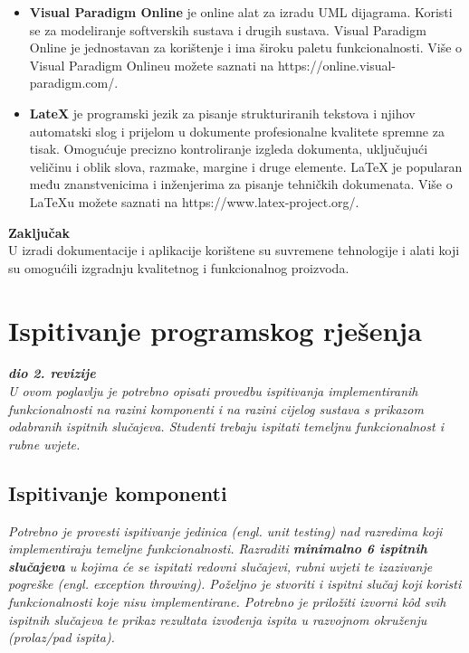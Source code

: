 \begin{itemize}
			\item\textbf{Visual Paradigm Online} je online alat za izradu UML dijagrama. Koristi se za modeliranje softverskih sustava i drugih sustava. Visual Paradigm Online je jednostavan za korištenje i ima široku paletu funkcionalnosti. Više o Visual Paradigm Onlineu možete saznati na https://online.visual-paradigm.com/.
			
			\item\textbf{LateX} je programski jezik za pisanje strukturiranih tekstova i njihov automatski slog i prijelom u dokumente profesionalne kvalitete spremne za tisak. Omogućuje precizno kontroliranje izgleda dokumenta, uključujući veličinu i oblik slova, razmake, margine i druge elemente. LaTeX je popularan među znanstvenicima i inženjerima za pisanje tehničkih dokumenata. Više o LaTeXu možete saznati na https://www.latex-project.org/.
			\end{itemize}
			
			\textbf{Zaključak}\\
			U izradi dokumentacije i aplikacije korištene su suvremene tehnologije i alati koji su omogućili izgradnju kvalitetnog i funkcionalnog proizvoda.
			
			
		
	
		\section{Ispitivanje programskog rješenja}
			
			\textbf{\textit{dio 2. revizije}}\\
			
			 \textit{U ovom poglavlju je potrebno opisati provedbu ispitivanja implementiranih funkcionalnosti na razini komponenti i na razini cijelog sustava s prikazom odabranih ispitnih slučajeva. Studenti trebaju ispitati temeljnu funkcionalnost i rubne uvjete.}
	
			
			\subsection{Ispitivanje komponenti}
			\textit{Potrebno je provesti ispitivanje jedinica (engl. unit testing) nad razredima koji implementiraju temeljne funkcionalnosti. Razraditi \textbf{minimalno 6 ispitnih slučajeva} u kojima će se ispitati redovni slučajevi, rubni uvjeti te izazivanje pogreške (engl. exception throwing). Poželjno je stvoriti i ispitni slučaj koji koristi funkcionalnosti koje nisu implementirane. Potrebno je priložiti izvorni kôd svih ispitnih slučajeva te prikaz rezultata izvođenja ispita u razvojnom okruženju (prolaz/pad ispita). }
			
